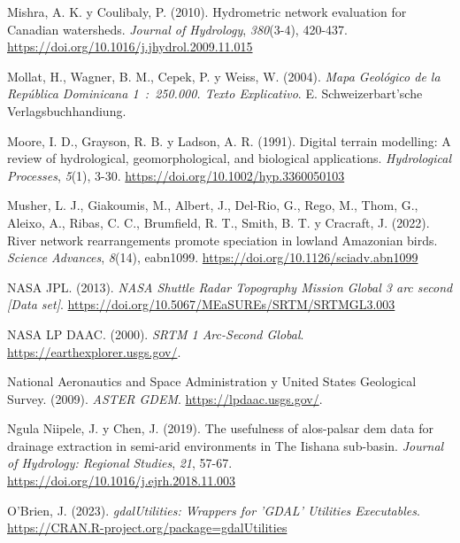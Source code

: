 \documentclass[spanish]{article}
\newlength{\cslhangindent}
\newlength{\cslentryspacingunit} %
\newenvironment{CSLReferences}[2] %
 {%
  \setlength{\parindent}{0pt}
  \ifodd #1
  \let\oldpar\par
  \def\par{\hangindent=\cslhangindent\oldpar}
  \fi
  \setlength{\parskip}{#2\cslentryspacingunit}
 }%
 {}
\begin{document}
\begin{CSLReferences}{1}{0}
\leavevmode{}%
Mishra, A. K. y Coulibaly, P. (2010). Hydrometric network evaluation for
Canadian watersheds. \emph{Journal of Hydrology}, \emph{380}(3-4),
420-437. \url{https://doi.org/10.1016/j.jhydrol.2009.11.015}

\leavevmode{}%
Mollat, H., Wagner, B. M., Cepek, P. y Weiss, W. (2004). \emph{{Mapa
Geol{ó}gico de la Rep{ú}blica Dominicana 1~:~250.000. Texto
Explicativo}}. E. Schweizerbart'sche Verlagsbuchhandiung.

\leavevmode{}%
Moore, I. D., Grayson, R. B. y Ladson, A. R. (1991). Digital terrain
modelling: A review of hydrological, geomorphological, and biological
applications. \emph{Hydrological Processes}, \emph{5}(1), 3-30.
\url{https://doi.org/10.1002/hyp.3360050103}

\leavevmode{}%
Musher, L. J., Giakoumis, M., Albert, J., Del-Rio, G., Rego, M., Thom,
G., Aleixo, A., Ribas, C. C., Brumfield, R. T., Smith, B. T. y Cracraft,
J. (2022). River network rearrangements promote speciation in lowland
{Amazonian} birds. \emph{Science Advances}, \emph{8}(14), eabn1099.
\url{https://doi.org/10.1126/sciadv.abn1099}

\leavevmode{}%
NASA JPL. (2013). \emph{NASA Shuttle Radar Topography Mission Global 3
arc second {[}Data set{]}}.
\url{https://doi.org/10.5067/MEaSUREs/SRTM/SRTMGL3.003}

\leavevmode{}%
NASA LP DAAC. (2000). \emph{SRTM 1 Arc-Second Global}.
\url{https://earthexplorer.usgs.gov/}.

\leavevmode{}%
National Aeronautics and Space Administration y United States Geological
Survey. (2009). \emph{{ASTER GDEM}}. \url{https://lpdaac.usgs.gov/}.

\leavevmode{}%
Ngula Niipele, J. y Chen, J. (2019). {The usefulness of alos-palsar dem
data for drainage extraction in semi-arid environments in The Iishana
sub-basin}. \emph{Journal of Hydrology: Regional Studies}, \emph{21},
57-67. \url{https://doi.org/10.1016/j.ejrh.2018.11.003}

\leavevmode{}%
O'Brien, J. (2023). \emph{gdalUtilities: Wrappers for 'GDAL' Utilities
Executables}. \url{https://CRAN.R-project.org/package=gdalUtilities}


\end{CSLReferences}
\end{document}
